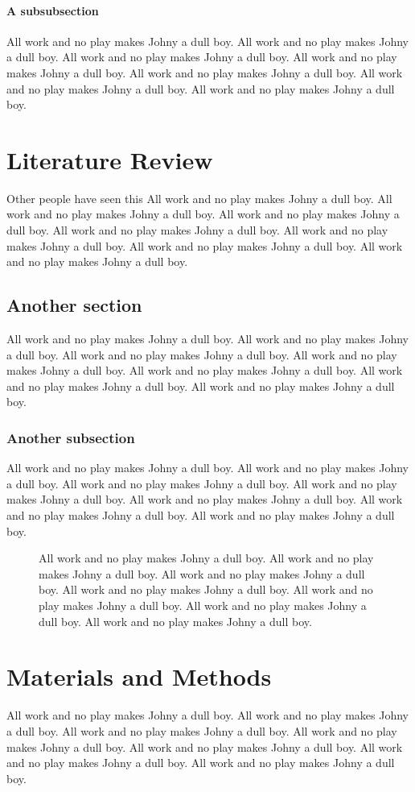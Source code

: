 \documentclass[12pt]{orstthesis}
\begin{document}
\subsubsection{A subsubsection}
All work and no play makes Johny a dull boy.
All work and no play makes Johny a dull boy.
All work and no play makes Johny a dull boy.
All work and no play makes Johny a dull boy.
All work and no play makes Johny a dull boy.
All work and no play makes Johny a dull boy.
All work and no play makes Johny a dull boy.
\chapter{Literature Review}
Other people have seen this\cite{plank}
All work and no play makes Johny a dull boy.
All work and no play makes Johny a dull boy.
All work and no play makes Johny a dull boy.
All work and no play makes Johny a dull boy.
All work and no play makes Johny a dull boy.
All work and no play makes Johny a dull boy.
All work and no play makes Johny a dull boy.
\section{Another section}
All work and no play makes Johny a dull boy.
All work and no play makes Johny a dull boy.
All work and no play makes Johny a dull boy.
All work and no play makes Johny a dull boy.
All work and no play makes Johny a dull boy.
All work and no play makes Johny a dull boy.
All work and no play makes Johny a dull boy.
\subsection{Another subsection}
All work and no play makes Johny a dull boy.
All work and no play makes Johny a dull boy.
All work and no play makes Johny a dull boy.
All work and no play makes Johny a dull boy.
All work and no play makes Johny a dull boy.
All work and no play makes Johny a dull boy.
All work and no play makes Johny a dull boy.
\begin{figure}
\caption[
All work and no play makes Johny a dull boy.
]{
All work and no play makes Johny a dull boy.
All work and no play makes Johny a dull boy.
All work and no play makes Johny a dull boy.
All work and no play makes Johny a dull boy.
All work and no play makes Johny a dull boy.
All work and no play makes Johny a dull boy.
All work and no play makes Johny a dull boy.
}
\end{figure}
\chapter{Materials and Methods}
All work and no play makes Johny a dull boy.
All work and no play makes Johny a dull boy.
All work and no play makes Johny a dull boy.
All work and no play makes Johny a dull boy.
All work and no play makes Johny a dull boy.
All work and no play makes Johny a dull boy.
All work and no play makes Johny a dull boy.
\end{document}
